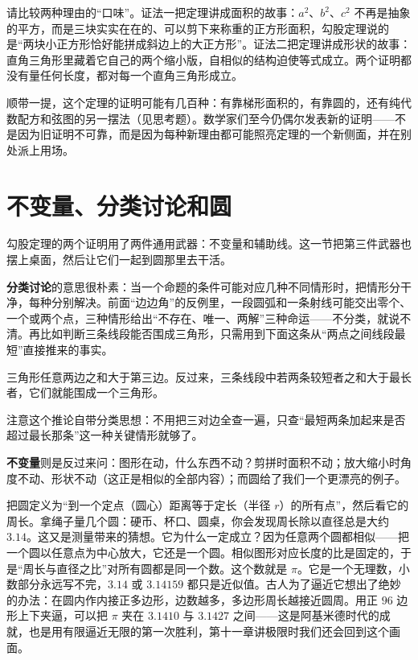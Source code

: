 请比较两种理由的“口味”。证法一把定理讲成面积的故事：$a^2$、$b^2$、$c^2$ 不再是抽象的平方，而是三块实实在在的、可以剪下来称重的正方形面积，勾股定理说的是“两块小正方形恰好能拼成斜边上的大正方形”。证法二把定理讲成形状的故事：直角三角形里藏着它自己的两个缩小版，自相似的结构迫使等式成立。两个证明都没有量任何长度，都对每一个直角三角形成立。

顺带一提，这个定理的证明可能有几百种：有靠梯形面积的，有靠圆的，还有纯代数配方和弦图的另一摆法（见思考题）。数学家们至今仍偶尔发表新的证明——不是因为旧证明不可靠，而是因为每种新理由都可能照亮定理的一个新侧面，并在别处派上用场。

\section{不变量、分类讨论和圆}

勾股定理的两个证明用了两件通用武器：不变量和辅助线。这一节把第三件武器也摆上桌面，然后让它们一起到圆那里去干活。

\textbf{分类讨论}的意思很朴素：当一个命题的条件可能对应几种不同情形时，把情形分干净，每种分别解决。前面“边边角”的反例里，一段圆弧和一条射线可能交出零个、一个或两个点，三种情形给出“不存在、唯一、两解”三种命运——不分类，就说不清。再比如判断三条线段能否围成三角形，只需用到下面这条从“两点之间线段最短”直接推来的事实。

\begin{tuilun}[三角形不等式]
三角形任意两边之和大于第三边。反过来，三条线段中若两条较短者之和大于最长者，它们就能围成一个三角形。
\end{tuilun}

注意这个推论自带分类思想：不用把三对边全查一遍，只查“最短两条加起来是否超过最长那条”这一种关键情形就够了。

\textbf{不变量}则是反过来问：图形在动，什么东西不动？剪拼时面积不动；放大缩小时角度不动、形状不动（这正是相似的全部内容）；而圆给了我们一个更漂亮的例子。

把圆定义为“到一个定点（圆心）距离等于定长（半径 $r$）的所有点”，然后看它的周长。拿绳子量几个圆：硬币、杯口、圆桌，你会发现周长除以直径总是大约 $3.14$。这又是测量带来的猜想。它为什么一定成立？因为任意两个圆都相似——把一个圆以任意点为中心放大，它还是一个圆。相似图形对应长度的比是固定的，于是“周长与直径之比”对所有圆都是同一个数。这个数就是 $\pi$。它是一个无理数，小数部分永远写不完，$3.14$ 或 $3.14159$ 都只是近似值。古人为了逼近它想出了绝妙的办法：在圆内作内接正多边形，边数越多，多边形周长越接近圆周。用正 $96$ 边形上下夹逼，可以把 $\pi$ 夹在 $3.1410$ 与 $3.1427$ 之间——这是阿基米德时代的成就，也是用有限逼近无限的第一次胜利，第十一章讲极限时我们还会回到这个画面。

